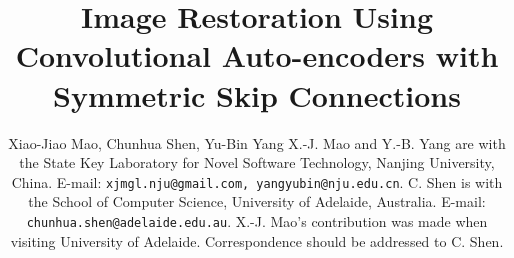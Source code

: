 \documentclass[10pt,journal,compsoc]{IEEEtran}
\begin{document}
\title
{
Image Restoration Using  Convolutional Auto-encoders with Symmetric Skip Connections
}


\author
{
	Xiao-Jiao Mao, Chunhua Shen, Yu-Bin Yang
	\IEEEcompsocitemizethanks
	{
		\IEEEcompsocthanksitem
        X.-J. Mao and Y.-B. Yang are with the State Key Laboratory
		for Novel Software Technology, Nanjing University, China.
        E-mail: {\tt xjmgl.nju@gmail.com, yangyubin@nju.edu.cn}.
		\IEEEcompsocthanksitem
        C. Shen is with the School of Computer Science,
		University of Adelaide, Australia.
        E-mail: {\tt chunhua.shen@adelaide.edu.au}.
        \IEEEcompsocthanksitem
        X.-J. Mao's contribution was made when visiting University of Adelaide.
        Correspondence should be addressed to C. Shen.
	}
}



\end{document}
